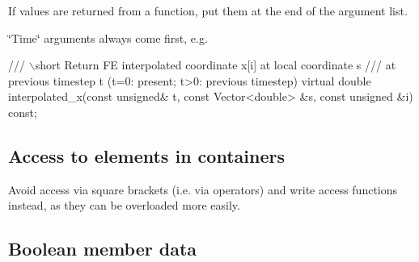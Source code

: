 \begin{DoxyItemize}
\item If values are returned from a function, put them at the end of the argument list.
\item \char`\"{}\-Time\char`\"{} arguments always come first, e.\-g. 
\begin{DoxyCode}
\textcolor{comment}{/// \(\backslash\)short Return FE interpolated coordinate x[i] at local coordinate s}
\textcolor{comment}{}\textcolor{comment}{/// at previous timestep t (t=0: present; t>0: previous timestep)}
\textcolor{comment}{}\textcolor{keyword}{virtual} \textcolor{keywordtype}{double} interpolated\_x(\textcolor{keyword}{const} \textcolor{keywordtype}{unsigned}& t, 
                              \textcolor{keyword}{const} Vector<double> &s,
                              \textcolor{keyword}{const} \textcolor{keywordtype}{unsigned} &i) \textcolor{keyword}{const};
\end{DoxyCode}

\end{DoxyItemize}\hypertarget{index_brackets}{}\subsection{Access to elements in containers}\label{index_brackets}

\begin{DoxyItemize}
\item Avoid access via square brackets (i.\-e. via operators) and write access functions instead, as they can be overloaded more easily.
\end{DoxyItemize}\hypertarget{index_boolean}{}\subsection{Boolean member data}\label{index_boolean}

